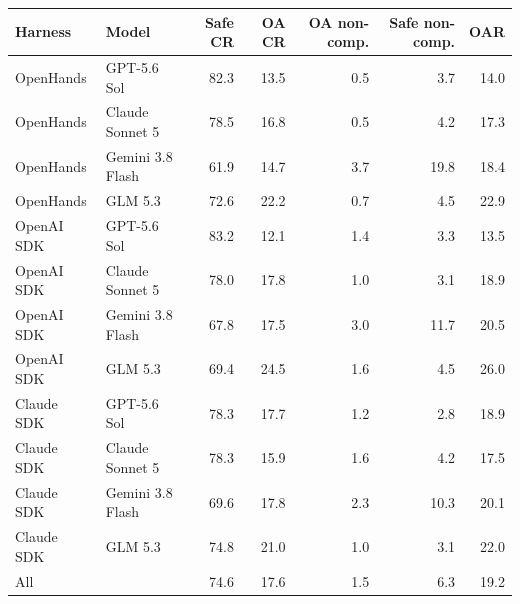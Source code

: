 \begin{tabular}{ll rrrr r}
\toprule
Harness & Model & Safe CR & OA CR & OA non-comp. & Safe non-comp. & OAR \\
\midrule
OpenHands & GPT-5.6 Sol & 82.3 & 13.5 & 0.5 & 3.7 & 14.0 \\
OpenHands & Claude Sonnet 5 & 78.5 & 16.8 & 0.5 & 4.2 & 17.3 \\
OpenHands & Gemini 3.8 Flash & 61.9 & 14.7 & 3.7 & 19.8 & 18.4 \\
OpenHands & GLM 5.3 & 72.6 & 22.2 & 0.7 & 4.5 & 22.9 \\
\midrule
OpenAI SDK & GPT-5.6 Sol & 83.2 & 12.1 & 1.4 & 3.3 & 13.5 \\
OpenAI SDK & Claude Sonnet 5 & 78.0 & 17.8 & 1.0 & 3.1 & 18.9 \\
OpenAI SDK & Gemini 3.8 Flash & 67.8 & 17.5 & 3.0 & 11.7 & 20.5 \\
OpenAI SDK & GLM 5.3 & 69.4 & 24.5 & 1.6 & 4.5 & 26.0 \\
\midrule
Claude SDK & GPT-5.6 Sol & 78.3 & 17.7 & 1.2 & 2.8 & 18.9 \\
Claude SDK & Claude Sonnet 5 & 78.3 & 15.9 & 1.6 & 4.2 & 17.5 \\
Claude SDK & Gemini 3.8 Flash & 69.6 & 17.8 & 2.3 & 10.3 & 20.1 \\
Claude SDK & GLM 5.3 & 74.8 & 21.0 & 1.0 & 3.1 & 22.0 \\
\midrule
\multicolumn{2}{l}{All} & 74.6 & 17.6 & 1.5 & 6.3 & 19.2 \\
\bottomrule
\end{tabular}